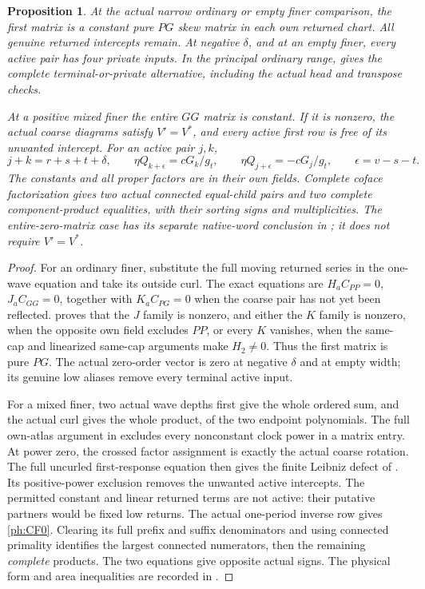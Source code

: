 \documentclass[11pt,a4paper]{amsart}
\numberwithin{equation}{section}
\theoremstyle{plain}
\newtheorem{proposition}[theorem]{Proposition}
\theoremstyle{definition}
\begin{document}
\begin{proposition}\label{ph:first-response}
At the actual narrow ordinary or empty finer comparison, the first matrix
is a constant pure \(PG\) skew matrix in each own returned chart.
All genuine returned intercepts remain.  At negative \(\delta\), and at
an empty finer, every active pair has four private inputs.
In the principal ordinary range,  gives the
complete terminal-or-private alternative, including the actual head
and transpose checks.

At a positive mixed finer the entire \(GG\) matrix is constant.  If it is
nonzero, the actual coarse diagrams satisfy \(V'=V^*\), and every active
first row is free of its unwanted intercept.  For an active pair \(j,k\),
\begin{equation}\label{ph:CF0}
 j+k=r+s+t+\delta,\qquad
 \eta Q_{k+\epsilon}=cG_k/g_t,\qquad
 \eta Q_{j+\epsilon}=-cG_j/g_t,\qquad \epsilon=v-s-t.
\end{equation}
The constants and all proper factors are in their own fields.  Complete
coface factorization gives two actual connected equal-child pairs and two
complete component-product equalities, with their sorting signs and
multiplicities.  The entire-zero-matrix case has its separate native-word
conclusion in ; it does not require \(V'=V^*\).
\end{proposition}
\begin{proof}
For an ordinary finer, substitute the full moving returned series in the
one-wave equation and take its outside curl.  The exact equations are
\(H_aC_{PP}=0\), \(J_aC_{GG}=0\), together with
\(K_aC_{PG}=0\) when the coarse pair has not yet been reflected.
 proves that the \(J\) family is nonzero, and either
the \(K\) family is nonzero, when the opposite own field excludes \(PP\),
or every \(K\) vanishes, when the same-cap and linearized same-cap
arguments make \(H_2\ne0\).  Thus the first matrix is pure \(PG\).
The actual zero-order vector is zero at negative \(\delta\) and at
empty width; its genuine low aliases remove every terminal active input.

For a mixed finer, two actual wave depths first give the whole ordered
sum, and the actual curl gives the whole product, of the two endpoint
polynomials.  The full own-atlas argument in 
excludes every nonconstant clock power in a matrix entry.  At power zero,
the crossed factor assignment is exactly the actual coarse rotation.
The full uncurled first-response equation then gives the finite Leibniz
defect of .  Its positive-power exclusion
removes the unwanted active intercepts.  The permitted constant and
linear returned terms are not active: their putative partners would be
fixed low returns.  The actual one-period inverse row gives
\eqref{ph:CF0}.  Clearing its full prefix and suffix denominators and
using connected primality identifies the largest connected numerators,
then the remaining \emph{complete} products.  The two equations give
opposite actual signs.  The physical form and area inequalities are
recorded in .
\end{proof}
\end{document}
